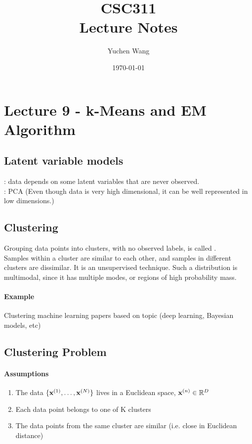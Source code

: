 \documentclass[11pt]{article}
\title{CSC311 \\ Lecture Notes}
\author{Yuchen Wang}
\date{\today}
\begin{document}
    \maketitle
    \tableofcontents
    \newpage
    
    
\section{Lecture 9 - k-Means and EM Algorithm}
\subsection{Latent variable models}
: data depends on some latent variables that are never observed. \\
: PCA (Even though data is very high dimensional, it can be well represented in low dimensions.)

\subsection{Clustering}
Grouping data points into clusters, with no observed labels, is called . \\
Samples within a cluster are similar to each other, and samples in different clusters are dissimilar. It is an unsupervised technique. Such a distribution is multimodal, since it has multiple modes, or regions of high probability mass.
    
\paragraph{Example} Clustering machine learning papers based on topic (deep learning, Bayesian models, etc)

\subsection{Clustering Problem}
\paragraph{Assumptions}
\begin{enumerate}
	\item The data $\{\textbf{x}^{(1)}, \hdots, \textbf{x}^{(N)}\}$ lives in a Euclidean space, $\textbf{x}^{(n)} \in \mathbb{R}^D$
	\item Each data point belongs to one of K clusters
	\item The data points from the same cluster are similar (i.e. close in Euclidean distance)
\end{enumerate}
\end{document}
